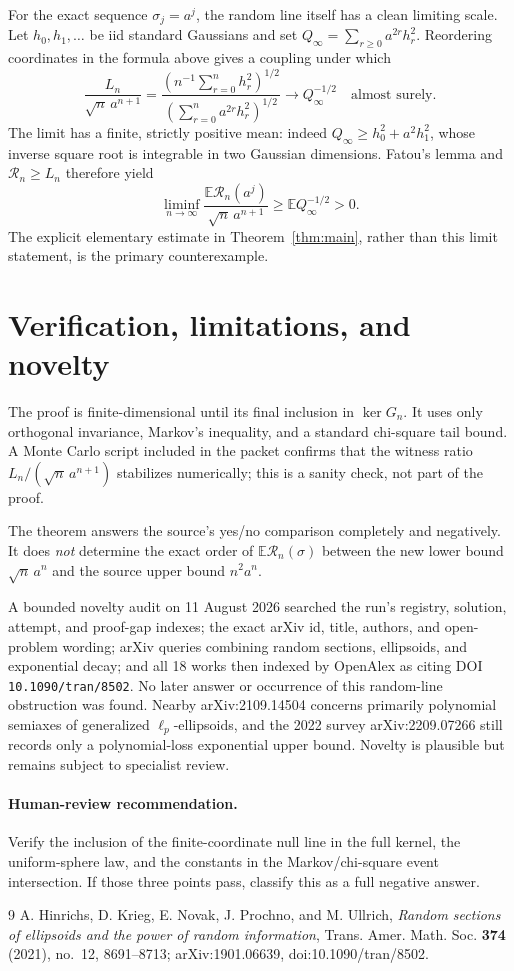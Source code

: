 \documentclass[11pt]{article}
\newcommand{\E}{\mathbb E}
\newcommand{\cR}{\mathcal R}
\begin{document}
For the exact sequence $\sigma_j=a^j$, the random line itself has a clean
limiting scale.  Let $h_0,h_1,\ldots$ be iid standard Gaussians and set
$Q_\infty=\sum_{r\ge0}a^{2r}h_r^2$.  Reordering coordinates in the formula
above gives a coupling under which
\[
 \frac{L_n}{\sqrt n\,a^{n+1}}
 =\frac{(n^{-1}\sum_{r=0}^{n}h_r^2)^{1/2}}
        {(\sum_{r=0}^{n}a^{2r}h_r^2)^{1/2}}
 \longrightarrow Q_\infty^{-1/2}
 \quad\text{almost surely}.
\]
The limit has a finite, strictly positive mean: indeed
$Q_\infty\ge h_0^2+a^2h_1^2$, whose inverse square root is integrable in two
Gaussian dimensions.  Fatou's lemma and $\cR_n\ge L_n$ therefore yield
\[
 \liminf_{n\to\infty}
 \frac{\E\cR_n(a^j)}{\sqrt n\,a^{n+1}}
 \ge \E Q_\infty^{-1/2}>0.
\]
The explicit elementary estimate in Theorem~\ref{thm:main}, rather than this
limit statement, is the primary counterexample.

\section{Verification, limitations, and novelty}

The proof is finite-dimensional until its final inclusion in $\ker G_n$.
It uses only orthogonal invariance, Markov's inequality, and a standard
chi-square tail bound.  A Monte Carlo script included in the packet confirms
that the witness ratio $L_n/(\sqrt n\,a^{n+1})$ stabilizes numerically; this is
a sanity check, not part of the proof.

The theorem answers the source's yes/no comparison completely and negatively.
It does \emph{not} determine the exact order of $\E\cR_n(\sigma)$ between the
new lower bound $\sqrt n\,a^n$ and the source upper bound $n^2a^n$.

A bounded novelty audit on 11 August 2026 searched the run's registry,
solution, attempt, and proof-gap indexes; the exact arXiv id, title, authors,
and open-problem wording; arXiv queries combining random sections, ellipsoids,
and exponential decay; and all 18 works then indexed by OpenAlex as citing
DOI \texttt{10.1090/tran/8502}.  No later answer or occurrence of this
random-line obstruction was found.  Nearby arXiv:2109.14504 concerns primarily
polynomial semiaxes of generalized $\ell_p$-ellipsoids, and the 2022 survey
arXiv:2209.07266 still records only a polynomial-loss exponential upper bound.
Novelty is plausible but remains subject to specialist review.

\paragraph{Human-review recommendation.}
Verify the inclusion of the finite-coordinate null line in the full kernel,
the uniform-sphere law, and the constants in the Markov/chi-square event
intersection.  If those three points pass, classify this as a full negative
answer.

\begin{thebibliography}{9}
A. Hinrichs, D. Krieg, E. Novak, J. Prochno, and M. Ullrich,
\emph{Random sections of ellipsoids and the power of random information},
Trans. Amer. Math. Soc. \textbf{374} (2021), no.~12, 8691--8713;
arXiv:1901.06639, doi:10.1090/tran/8502.
\end{thebibliography}
\end{document}
